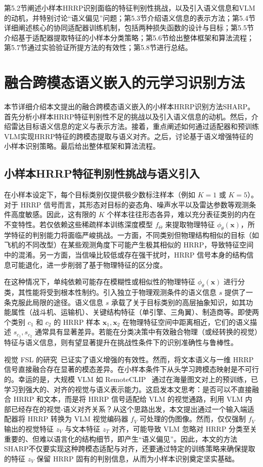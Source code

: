 第5.2节阐述小样本HRRP识别面临的特征判别性挑战，以及引入语义信息和VLM的动机，并特别讨论“语义偏见”问题；第5.3节介绍语义信息的表示方法；第5.4节详细阐述核心的协同适配器训练机制，包括两种损失函数的设计与目标；第5.5节介绍基于适配器提取特征的小样本分类策略；第5.6节给出整体框架和算法流程；第5.7节通过实验验证所提方法的有效性；第5.8节进行总结。

\section{融合跨模态语义嵌入的元学习识别方法}
\label{sec:semantic_method}

本节详细介绍本文提出的融合跨模态语义嵌入的小样本HRRP识别方法SHARP。首先分析小样本HRRP特征判别性不足的挑战以及引入语义信息的动机。然后，介绍雷达目标语义信息的定义与表示方法。接着，重点阐述如何通过适配器和预训练VLM实现HRRP特征的跨模态提取与语义对齐。之后，讨论基于语义增强特征的小样本识别策略。最后给出整体框架和算法流程。

\subsection{小样本HRRP特征判别性挑战与语义引入}
\label{subsec:semantic_challenge}

在小样本设定下，每个目标类别仅提供极少数标注样本（例如 $K=1$ 或 $K=5$）。对于 HRRP 信号而言，其形态对目标的姿态角、噪声水平以及雷达参数等观测条件高度敏感。因此，这有限的 $K$ 个样本往往形态各异，难以充分表征类别的内在不变特性。若仅依赖这些稀疏样本训练深度模型 $f_\Theta$ 来提取物理特征 $\phi_\theta(\mathbf{x})$，所学特征的判别能力将面临严峻挑战。一方面，不同类别但物理结构相似的目标（如飞机的不同改型）在某些观测角度下可能产生极其相似的 HRRP，导致特征空间中的混淆。另一方面，当信噪比较低或存在强干扰时，HRRP 信号本身的结构信息可能退化，进一步削弱了基于物理特征的区分度。 

在这种情况下，单纯依赖可能存在模糊性或相似性的物理特征 $\phi_\theta(\mathbf{x})$ 进行分类，其性能将受到根本性制约。引入独立于物理观测条件的语义信息 $s$ 提供了一条克服此局限的途径。语义信息 $s$ 承载了关于目标类别的高层抽象知识，如其功能属性（战斗机、运输机）、关键结构特征（单引擎、三角翼）、制造商等。即使两个类别 $c_1$ 和 $c_2$ 的 HRRP 样本 $\mathbf{x}_1, \mathbf{x}_2$ 在物理特征空间中距离相近，它们的语义描述 $s_{c_1}, s_{c_2}$ 通常具有显著差异。若能在分类决策中有效融合物理（或经转换的视觉）特征与语义信息，则有望显著提升在挑战性条件下的识别准确性与鲁棒性。 

视觉 FSL 的研究~\cite{SemFew, CNSPN}已证实了语义增强的有效性。然而，将文本语义与一维 HRRP 信号直接融合存在显著的模态差异。在小样本条件下从头学习跨模态映射是不可行的。幸运的是，大规模 VLM 如 RemoteCLIP~\cite{RemoteCLIP} 通过在海量图文对上的预训练，已学习到强大的、对齐的视觉与语义表示能力。这启发本文思考：是否可以不直接融合 HRRP 和文本，而是将 HRRP 信号适配给 VLM 的视觉通路，利用 VLM 内部已经存在的视觉-语义对齐关系？从这个思路出发，本文提出通过一个输入端适配器将 HRRP 转换为 VLM 视觉编码器 $f_V$ 可处理的伪图像。然而，仅仅强制 $f_V$ 输出的视觉特征 $z_V$ 与文本特征 $z_T$ 对齐，可能导致 VLM 忽略对 HRRP 分类至关重要的、但难以语言化的结构细节，即产生“语义偏见”。因此，本文的方法SHARP不仅要实现这种跨模态适配与对齐，还要通过特定的训练策略来确保提取的特征 $z_V$ 保留 HRRP 固有的判别信息，从而为小样本识别奠定坚实基础。

